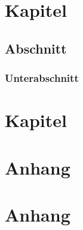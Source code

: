 

\frontmatter

\mainmatter

\chapter{Kapitel}

\section{Abschnitt}

\subsection{Unterabschnitt}

\chapter{Kapitel}


\appendix
\chapter{Anhang}

\chapter{Anhang}


\backmatter


